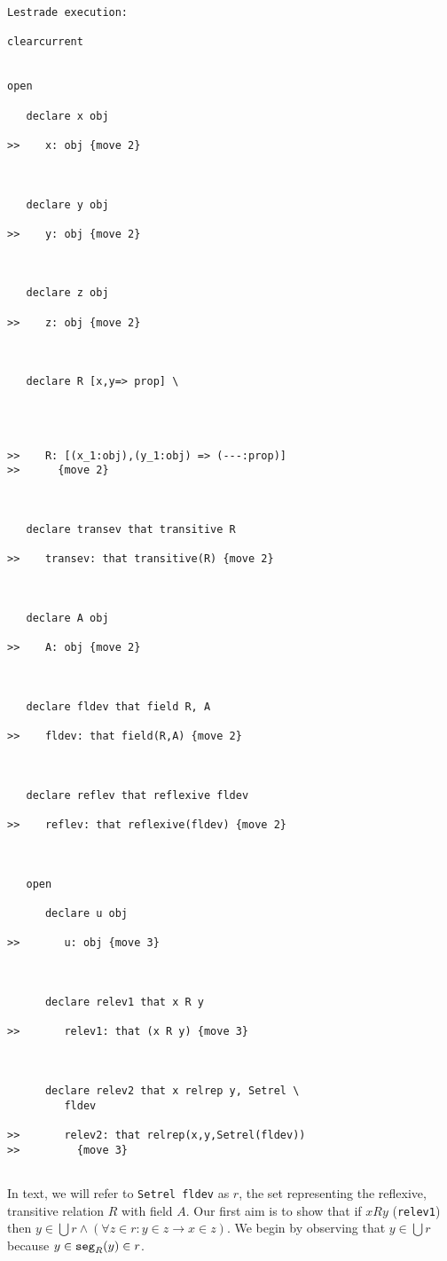 \documentclass{article}
\begin{document}
\begin{verbatim}Lestrade execution:

clearcurrent


open

   declare x obj

>>    x: obj {move 2}



   declare y obj

>>    y: obj {move 2}



   declare z obj

>>    z: obj {move 2}



   declare R [x,y=> prop] \
      



>>    R: [(x_1:obj),(y_1:obj) => (---:prop)]
>>      {move 2}



   declare transev that transitive R

>>    transev: that transitive(R) {move 2}



   declare A obj

>>    A: obj {move 2}



   declare fldev that field R, A

>>    fldev: that field(R,A) {move 2}



   declare reflev that reflexive fldev

>>    reflev: that reflexive(fldev) {move 2}



   open

      declare u obj

>>       u: obj {move 3}



      declare relev1 that x R y

>>       relev1: that (x R y) {move 3}



      declare relev2 that x relrep y, Setrel \
         fldev

>>       relev2: that relrep(x,y,Setrel(fldev))
>>         {move 3}


\end{verbatim}

In text, we will refer to {\tt Setrel fldev} as $r$, the set representing the reflexive, transitive relation $R$ with field $A$.  Our first aim is to show that if $x R y$ ({\tt relev1}) then $y \in \bigcup r \wedge (\forall z \in r: y \in z \rightarrow x \in z)$.  We begin by observing that $y \in \bigcup r$ because $y \in {\tt seg}_R(y) \in r$.
\end{document}
